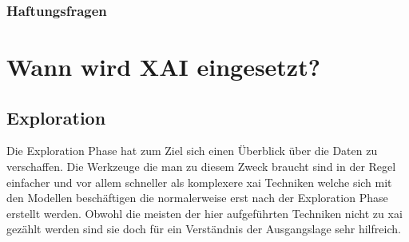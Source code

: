 \documentclass[
  12pt, %
  a4paper, %
  oneside, %
  openany, 
  numbers=noenddot, %
  BCOR=5mm, %
  parskip=half*, %
  thesis, %
]{bfhbook}
\begin{document}
\subsection{Haftungsfragen}

\chapter{Wann wird XAI eingesetzt?}

\section{Exploration}
Die Exploration Phase hat zum Ziel sich einen Überblick über die Daten zu verschaffen. Die Werkzeuge die man zu diesem Zweck braucht sind in der Regel einfacher und vor allem schneller als komplexere \Gls{xai} Techniken welche sich mit den Modellen beschäftigen die normalerweise erst nach der Exploration Phase erstellt werden. Obwohl die meisten der hier aufgeführten Techniken nicht zu \acrshort{xai} gezählt werden sind sie doch für ein Verständnis der Ausgangslage sehr hilfreich.
\end{document}
